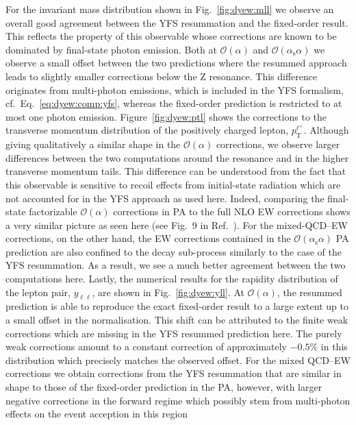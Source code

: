 \documentclass[11pt]{cernrep}
\newcommand{\order}{\ensuremath{\mathcal{O}}}
\newcommand{\alphas}{\ensuremath{\alpha_\mathrm{s}}}
\newcommand{\rT}{\ensuremath{\mathrm{T}}} %
\DeclareRobustCommand{\PZ}{{\ensuremath{\mathrm{Z}}}}
\DeclareRobustCommand{\Pl}{{\ensuremath{\ell}}}
\DeclareRobustCommand{\Plp}{{\ensuremath{\ell^+}}}
\begin{document}
For the invariant mass distribution shown in Fig.~\ref{fig:dyew:mll} we 
observe an overall good agreement between the YFS resummation and 
the fixed-order result. This reflects the property of this observable 
whose corrections are known to be dominated by final-state photon 
emission. Both at $\order(\alpha)$ and $\order(\alphas\alpha)$ we 
observe a small offset between the two predictions where the resummed 
approach leads to slightly smaller corrections below the $\PZ$ 
resonance. This difference originates from multi-photon emissions, 
which is included in the YFS formalism, cf.\ Eq.~\eqref{eq:dyew:comp:yfs}, 
whereas the fixed-order prediction is restricted to at most one 
photon emission.
Figure~\ref{fig:dyew:ptl} shows the corrections to the transverse momentum 
distribution of the positively charged lepton, $p_\rT^\Plp$. Although 
giving qualitatively a similar shape in the $\order(\alpha)$ corrections, 
we observe larger differences between the two computations around the 
resonance and in the higher transverse momentum tails. This difference 
can be understood from the fact that this observable is sensitive to 
recoil effects from initial-state radiation which are not accounted for 
in the YFS approach as used here.  Indeed, comparing the final-state 
factorizable $\order(\alpha)$ corrections in PA to the full NLO EW 
corrections shows a very similar picture as seen here (see Fig.~9 in 
Ref.~\cite{Dittmaier:2014qza}). For the mixed-QCD--EW corrections, on 
the other hand, the EW corrections contained in the 
$\order(\alphas\alpha)$ PA prediction are also confined to the decay 
sub-process similarly to the case of the YFS resummation. As a result, 
we see a much better agreement between the two computations here.
Lastly, the numerical results for the rapidity distribution of the 
lepton pair, $y_{\Pl\Pl}$, are shown in Fig.~\ref{fig:dyew:yll}. At 
$\order(\alpha)$, the resummed prediction is able to reproduce the 
exact fixed-order result to a large extent up to a small offset in 
the normalisation. This shift can be attributed to the finite weak 
corrections which are missing in the YFS resummed prediction here. 
The purely weak corrections amount to a constant correction of 
approximately $-0.5\%$ in this distribution which precisely matches 
the observed offset. For the mixed QCD--EW corrections we obtain 
corrections from the YFS resummation that are similar in shape to 
those of the fixed-order prediction in the PA, however, with larger 
negative corrections in the forward regime which possibly stem from 
multi-photon effects on the event acception in this region
\end{document}
